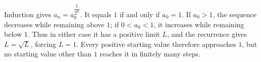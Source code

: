 Induction gives $a_n=a_0^{\dfrac{1}{2^n}}$. It equals $1$ if and only if $a_0=1$. If $a_0>1$, the sequence decreases while remaining above $1$; if $0<a_0<1$, it increases while remaining below $1$. Thus in either case it has a positive limit $L$, and the recurrence gives $L=\sqrt L$, forcing $L=1$. Every positive starting value therefore approaches $\boxed1$, but no starting value other than $1$ reaches it in finitely many steps.
